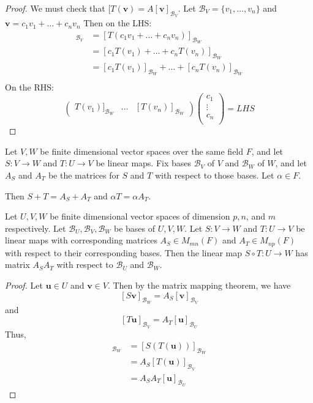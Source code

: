\documentclass{article}
\begin{document}
\begin{proof}
  We must check that $[T(\textbf{v}) = A[\textbf{v}]_{\mathcal{B}_V}$. Let $\mathcal{B}_V = \{v_1, \ldots, v_n\}$ and $\textbf{v} = c_1v_1 + \dots + c_nv_n$
    Then on the LHS:
    \begin{align*}
      [T(v)]_{\mathcal{B}_V} &= [T(c_1v_1+ \dots + c_nv_n)]_{\mathcal{B}_W}\\
      &= [c_1T(v_1) + \dots + c_nT(v_n)]_{\mathcal{B}_W}\\
      &= [c_1T(v_1)]_{\mathcal{B}_W} + \dots + [c_nT(v_n)]_{\mathcal{B}_W}\\
    \end{align*}
    On the RHS:
    \begin{equation*}
      \begin{pmatrix}
      T(v_1)]_{\mathcal{B}_W} & \dots & [T(v_n)]_{\mathcal{B}_W}
    \end{pmatrix}
    \begin{pmatrix}
      c_1\\\vdots\\c_n\\
    \end{pmatrix} = LHS
  \end{equation*}
\end{proof}
\begin{theorem}
  Let $V, W$ be finite dimensional vector spaces over the same field $F$, and let $S : V \to W$ and $T: U \to V$ be linear maps. Fix bases $\mathcal{B}_V$ of $V$ and $\mathcal{B}_W$ of $W$, and let $A_S$ and $A_T$ be the matrices for $S$ and $T$ with respect to those bases. Let $\alpha \in F$.

  Then $S + T = A_S + A_T$ and $\alpha T = \alpha A_T$.
\end{theorem}
\begin{theorem}
  Let $U, V, W$ be finite dimensional vector spaces of dimension $p, n$, and $m$ respectively. Let $\mathcal{B}_U, \mathcal{B}_V, \mathcal{B}_W$ be bases of $U, V, W$. Let $S : V \to W$ and $T: U \to V$ be linear maps with corresponding matrices $A_S \in M_{mn}(F)$ and $A_T \in M_{np}(F)$ with respect to their corresponding bases. Then the linear map $S \circ T: U \to W$ has matrix $A_SA_T$ with respect to $\mathcal{B}_U$ and $\mathcal{B}_W$.
\end{theorem}
\begin{proof}
  Let $\textbf{u} \in U$ and $\textbf{v} \in V$. Then by the matrix mapping theorem, we have \[
    [S\textbf{v}]_{\mathcal{B}_W} = A_S[\textbf{v}]_{\mathcal{B}_V}
  \]
  and \[
    [T\textbf{u}]_{\mathcal{B}_V} = A_T[\textbf{u}]_{\mathcal{B}_U}
  \]
  Thus,
  \begin{align*}
    [(ST)(\textbf{u})]_{\mathcal{B}_W} &= [S(T(\textbf{u}))]_{\mathcal{B}_W}\\
    &= A_S[T(\textbf{u})]_{\mathcal{B}_V}\\
    &= A_SA_T[\textbf{u}]_{\mathcal{B}_U}
  \end{align*}
\end{proof}
\end{document}
